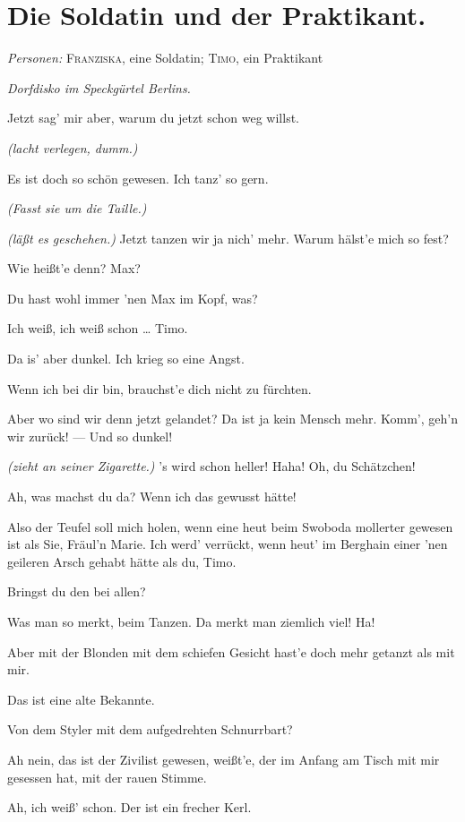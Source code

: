 \documentclass[
	final,
	a4paper,
	ngerman,
	mpinclude = true, %
	twoside = true,
	open = right,
	cleardoublepage = plain,
	DIV = 13,
	BCOR = 1cm,
	titlepage = firstiscover,
	]{scrbook}
\newcommand{\scene}{\section}
\newcommand{\direction}[1]{\textit{(#1)}}
\newcommand{\setting}[1]{\vspace{-0.5\baselineskip}\centering\textit{#1}}
\newcommand{\characterlist}[1]{{\begin{center}\textit{Personen:} #1\end{center}}}
\newcommand{\thecharacter}[1]{\textup{\textsc{#1}}\xspace}
\newcommand{\thesoldatin}{\thecharacter{Franziska}}
\newcommand{\thepraktikant}{\thecharacter{Timo}}
\newcommand{\character}[1]{\item[#1:]}
\newcommand{\soldatin}{\character{\thesoldatin}}
\newcommand{\praktikant}{\character{\thepraktikant}}
\begin{document}
\scene{Die Soldatin und der Praktikant.}
\characterlist{\thesoldatin, eine Soldatin; \thepraktikant, ein Praktikant}
\setting{Dorfdisko im Speckgürtel Berlins.}
\begin{play}
	\praktikant
	Jetzt sag' mir aber, warum du jetzt schon weg willst.

	\soldatin
	\direction{lacht verlegen, dumm.}

	\praktikant
	Es ist doch so schön gewesen. Ich tanz' so gern.

	\soldatin
	\direction{Fasst sie um die Taille.}

	\praktikant
	\direction{läßt es geschehen.} Jetzt tanzen wir ja nich' mehr. Warum hälst'e mich so fest?

	\soldatin
	Wie heißt'e denn? Max?

	\praktikant
	Du hast wohl immer 'nen Max im Kopf, was?

	\soldatin
	Ich weiß, ich weiß schon \ldots{} Timo.

	\praktikant
	Da is' aber dunkel. Ich krieg so eine Angst.

	\soldatin
	Wenn ich bei dir bin, brauchst'e dich nicht zu fürchten.

	\praktikant
	Aber wo sind wir denn jetzt gelandet? Da ist ja kein Mensch mehr. Komm', geh'n wir zurück! --- Und so dunkel!

	\soldatin
	\direction{zieht an seiner Zigarette.} 's wird schon heller! Haha! Oh, du Schätzchen!

	\praktikant
	Ah, was machst du da? Wenn ich das gewusst hätte!

	\soldatin
	Also der Teufel soll mich holen, wenn eine heut beim Swoboda mollerter gewesen ist als Sie, Fräul'n Marie.
	Ich werd' verrückt, wenn heut' im Berghain einer 'nen geileren Arsch gehabt hätte als du, Timo.

	\praktikant
	Bringst du den bei allen?

	\soldatin
	Was man so merkt, beim Tanzen. Da merkt man ziemlich viel! Ha!

	\praktikant
	Aber mit der Blonden mit dem schiefen Gesicht hast'e doch mehr getanzt als mit mir.

	\soldatin
	Das ist eine alte Bekannte.

	\praktikant
	Von dem Styler mit dem aufgedrehten Schnurrbart?

	\soldatin
	Ah nein, das ist der Zivilist gewesen, weißt'e, der im Anfang am Tisch mit mir gesessen hat, mit der rauen Stimme.

	\praktikant
	Ah, ich weiß' schon. Der ist ein frecher Kerl.


\end{play}
\end{document}
